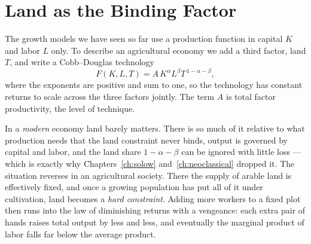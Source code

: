 \section{Land as the Binding Factor}

The growth models we have seen so far use a production function in capital $K$ and labor $L$ only. To describe an agricultural economy we add a third factor, land $T$, and write a Cobb--Douglas technology
\begin{equation}
F(K, L, T) = A\, K^{\alpha} L^{\beta} T^{\,1-\alpha-\beta},
\label{eq:malthus-prod}
\end{equation}
where the exponents are positive and sum to one, so the technology has constant returns to scale across the three factors jointly. The term $A$ is total factor productivity, the level of technique.

In a \emph{modern} economy land barely matters. There is so much of it relative to what production needs that the land constraint never binds, output is governed by capital and labor, and the land share $1-\alpha-\beta$ can be ignored with little loss --- which is exactly why Chapters~\ref{ch:solow} and~\ref{ch:neoclassical} dropped it. The situation reverses in an agricultural society. There the supply of arable land is effectively fixed, and once a growing population has put all of it under cultivation, land becomes a \emph{hard constraint}. Adding more workers to a fixed plot then runs into the law of diminishing returns with a vengeance: each extra pair of hands raises total output by less and less, and eventually the marginal product of labor falls far below the average product.



